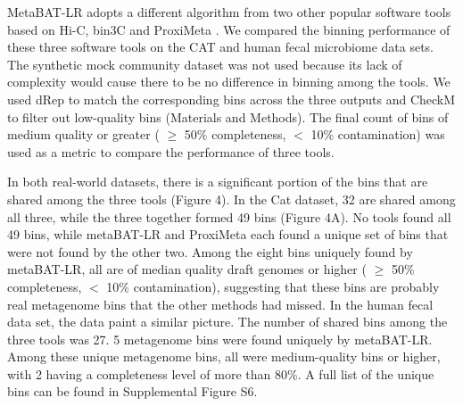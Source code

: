 \documentclass[fleqn,10pt,lineno]{wlpeerj}
\begin{document}
MetaBAT-LR adopts a different algorithm from two other popular software tools based on Hi-C, bin3C \citep{demaere2019bin3c} and ProxiMeta \citep{press2017hi}. We compared the binning performance of these three software tools on the CAT and human fecal microbiome data sets. The synthetic mock community dataset was not used because its lack of complexity would cause there to be no difference in binning among the tools. We used dRep to match the corresponding bins across the three outputs and CheckM to filter out low-quality bins (Materials and Methods). The final count of bins of medium quality or greater ( $\ge$ 50\% completeness, $<$ 10\% contamination) was used as a metric to compare the performance of three tools.

In both real-world datasets, there is a significant portion of the bins that are shared among the three tools (Figure 4). In the Cat dataset, 32 are shared among all three, while the three together formed 49 bins (Figure 4A). No tools found all 49 bins, while metaBAT-LR and ProxiMeta each found a unique set of bins that were not found by the other two. Among the eight bins uniquely found by metaBAT-LR, all are of median quality draft genomes or higher ( $\ge$ 50\% completeness, $<$ 10\% contamination), suggesting that these bins are probably real metagenome bins that the other methods had missed. In the human fecal data set, the data paint a similar picture. The number of shared bins among the three tools was 27. 5 metagenome bins were found uniquely by metaBAT-LR. Among these unique metagenome bins, all were medium-quality bins or higher, with 2 having a completeness level of more than 80\%. A full list of the unique bins can be found in Supplemental Figure S6.       
\end{document}

